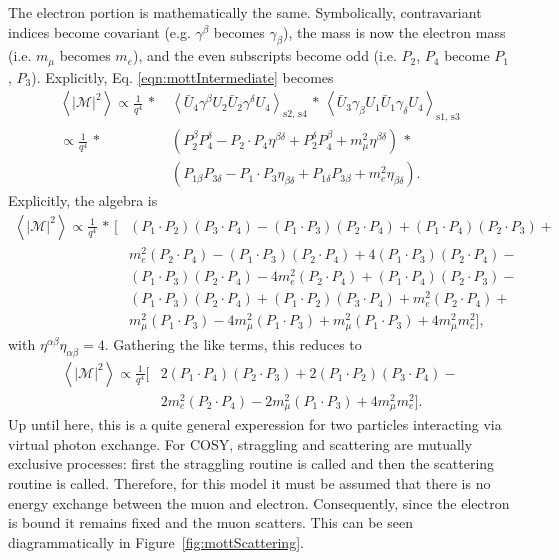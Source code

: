 The electron portion is mathematically the same. Symbolically, contravariant indices become covariant (e.g. $\gamma^\beta$ becomes $\gamma_\beta$), the mass is now the electron mass (i.e. $m_\mu$ becomes $m_e$), and the even subscripts become odd (i.e. $P_2$, $P_4$ become $P_1$, $P_3$). Explicitly, Eq. \eqref{eqn:mottIntermediate} becomes
\begin{align*}
\left< |\mathcal{M}|^2\right>
\propto\frac{1}{q^4} \, * \, &\left< \bar{U}_4 \gamma^\beta U_2 \bar{U}_2 \gamma^\delta U_4 \right> _\text{s2, s4} \, * \, \left< \bar{U}_3 \gamma_\beta U_1 \bar{U}_1 \gamma_\delta U_4 \right> _\text{s1, s3}\\
\propto \frac{1}{q^4} \, * \, &(P_2^\beta P_4^\delta - P_2 \cdot P_4 \eta^{\beta\delta}+P_2 ^\delta P_4 ^\beta + m_\mu ^2 \eta^{\beta\delta}) \, * \\
&(P_{1\beta} P_{3\delta} - P_1 \cdot P_3 \eta_{\beta\delta}+P_{1\delta} P_{3\beta} + m_e ^2 \eta_{\beta\delta}).
\end{align*}
Explicitly, the algebra is
\begin{align*}
\left< |\mathcal{M}|^2\right> \propto
\frac{1}{q^4} \, * \, [ &(P_1 \cdot P_2)(P_3 \cdot P_4)-(P_1\cdot P_3)(P_2 \cdot P_4) + (P_1 \cdot P_4)(P_2\cdot P_3)+\\
&m_e ^2 (P_2 \cdot P_4)-(P_1\cdot P_3)(P_2\cdot P_4)+4(P_1\cdot P_3)(P_2\cdot P_4)-\\
&(P_1\cdot P_3)(P_2\cdot P_4) - 4m_e ^2 (P_2 \cdot P_4)+(P_1\cdot P_4)(P_2 \cdot P_3)-\\
&(P_1 \cdot P_3)(P_2 \cdot P_4) + (P_1 \cdot P_2) (P_3 \cdot P_4) + m_e ^2 (P_2 \cdot P_4)+\\
&m_\mu ^2 (P_1 \cdot P_3)-4m_\mu ^2 (P_1\cdot P_3) + m_\mu ^2 (P_1 \cdot P_3) + 4m_\mu ^2 m_e ^2],
\end{align*}
with $\eta^{\alpha\beta} \eta_{\alpha\beta} = 4$. Gathering the like terms, this reduces to
\begin{align*}
\left< |\mathcal{M}|^2\right> \propto \frac{1}{q^4} [&2(P_1 \cdot P_4)(P_2\cdot P_3)+2(P_1\cdot P_2)(P_3 \cdot P_4) - \\
&2 m_e ^2 (P_2 \cdot P_4)-2m_\mu ^2 (P_1 \cdot P_3) + 4 m_\mu ^2 m_e ^2 ].
\end{align*}
Up until here, this is a quite general experession for two particles interacting via virtual photon exchange. For COSY, straggling and scattering are mutually exclusive processes: first the straggling routine is called and then the scattering routine is called. Therefore, for this model it must be assumed that there is no energy exchange between the muon and electron. Consequently, since the electron is bound it remains fixed and the muon scatters. This can be seen diagrammatically in Figure~\ref{fig:mottScattering}.


